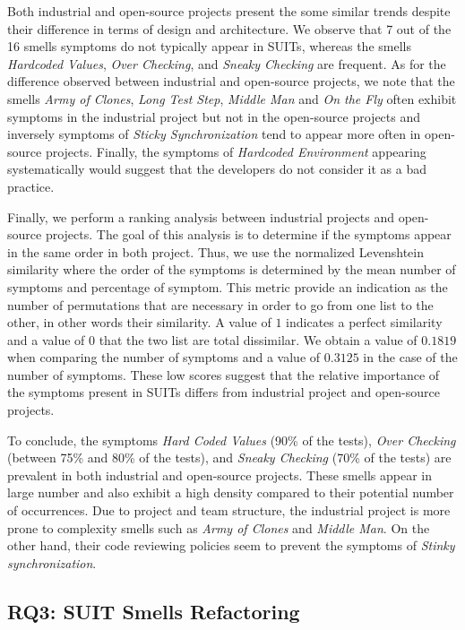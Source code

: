 Both industrial and open-source projects present the some similar trends despite their difference in terms of design and architecture. We observe that 7 out of the 16 smells symptoms do not typically appear in SUITs, whereas the smells \emph{Hardcoded Values}, \emph{Over Checking}, and \emph{Sneaky Checking} are frequent. As for the difference observed between industrial and open-source projects, we note that the smells \emph{Army of Clones}, \emph{Long Test Step}, \emph{Middle Man} and \emph{On the Fly} often exhibit symptoms in the industrial project but not in the open-source projects and inversely symptoms of \emph{Sticky Synchronization} tend to appear more often in open-source projects. Finally, the symptoms of \emph{Hardcoded Environment} appearing systematically would suggest that the developers do not consider it as a bad practice.

Finally, we perform a ranking analysis between industrial projects and open-source projects. The goal of this analysis is to determine if the symptoms appear in the same order in both project. Thus, we use the normalized Levenshtein similarity where the order of the symptoms is determined by the mean number of symptoms and percentage of symptom. This metric provide an indication as the number of permutations that are necessary in order to go from one list to the other, in other words their similarity. A value of $1$ indicates a perfect similarity and a value of $0$ that the two list are total dissimilar. We obtain a value of $0.1819$ when comparing the number of symptoms and a value of $0.3125$ in the case of the number of symptoms. These low scores suggest that the relative importance of the symptoms present in SUITs differs from industrial project and open-source projects.


To conclude, the symptoms \emph{Hard Coded Values} (90\% of the tests), \emph{Over Checking} (between 75\% and 80\% of the tests), and \emph{Sneaky Checking} (70\% of the tests) are prevalent in both industrial and open-source projects. These smells appear in large number and also exhibit a high density compared to their potential number of occurrences. Due to project and team structure, the industrial project is more prone to complexity smells such as \emph{Army of Clones} and \emph{Middle Man}. On the other hand, their code reviewing policies seem to prevent the symptoms of \emph{Stinky synchronization}.

\subsection{RQ3: SUIT Smells Refactoring}
\label{sec:results-smell-refactoring}

